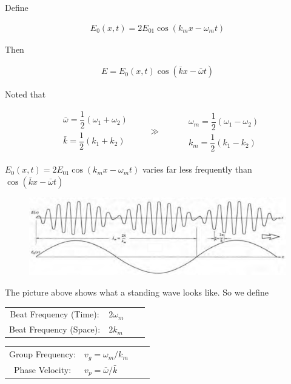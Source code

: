 Define

\begin{equation*}
  \begin{aligned}
    E_0 \left( x,t \right) = 2 E_{01} \cos \left( k_m x - \omega_m t \right)
  \end{aligned}
\end{equation*}

Then

\begin{equation*}
  \begin{aligned}
    E = E_0 \left( x , t \right) \cos \left( \bar{k} x - \bar{\omega} t \right)
  \end{aligned}
\end{equation*}

Noted that

\begin{equation*}
  \begin{aligned}
    & \bar{\omega} = \dfrac{1}{2} \left( \omega_1 + \omega_2 \right) \\ 
    & \bar{k} = \dfrac{1}{2} \left( k_1 + k_2 \right) \\
  \end{aligned}
  \quad\quad \gg \quad\quad
  \begin{aligned}
      & \omega_m = \dfrac{1}{2} \left( \omega_1 - \omega_2 \right) \\ 
      & k_m = \dfrac{1}{2} \left( k_1 - k_2 \right) 
  \end{aligned}
\end{equation*}

$E_0 \left( x,t \right) = 2 E_{01} \cos \left( k_m x - \omega_m t \right)$ varies far less frequently than $\cos \left( \bar{k} x - \bar{\omega} t \right)$

\begin{figure}[H]
  \centering
  \includegraphics[width=\linewidth]{figures/Standing-Wave}
\end{figure}

The picture above shows what a standing wave looks like. So we define

\begin{table}[h]
  \centering
  \begin{tabular}{Sl Sl}
    Beat Frequency (Time): & $2 \omega_m $ \\
    Beat Frequency (Space): & $ 2 k_m $ \\
  \end{tabular}
  \quad\quad\quad\quad\quad\quad\quad\quad
  \begin{tabular}{Sl Sl}
    Group Frequency: & $v_g = \omega_m / k_m $ \\
    Phase Velocity: & $ v_p = \bar{\omega} / \bar{k}$ \\
  \end{tabular}
\end{table}

